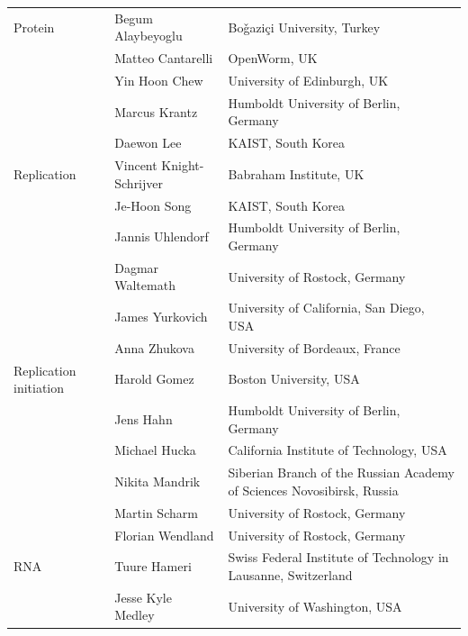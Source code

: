 \documentclass[journal,transmag]{IEEEtran}
\begin{document}
\begin{table}[ht!]
\begin{tabularx}{\textwidth}{l||l||X}
Protein                & Begum Alaybeyoglu                & Bo\v{g}azi\c{c}i University, Turkey\\
                       & Matteo Cantarelli                & OpenWorm, UK\\
                       & Yin Hoon Chew                    & University of Edinburgh, UK\\
                       & Marcus Krantz                    & Humboldt University of Berlin, Germany\\
                       & Daewon Lee                       & KAIST, South Korea\\\hline
Replication            & Vincent Knight-Schrijver         & Babraham Institute, UK\\
                       & Je-Hoon Song                     & KAIST, South Korea\\
                       & Jannis Uhlendorf                 & Humboldt University of Berlin, Germany\\
                       & Dagmar Waltemath                 & University of Rostock, Germany\\
                       & James Yurkovich                  & University of California, San Diego, USA\\
                       & Anna Zhukova                     & University of Bordeaux, France\\\hline
Replication initiation & Harold Gomez                     & Boston University, USA\\
                       & Jens Hahn                        & Humboldt University of Berlin, Germany\\
                       & Michael Hucka                    & California Institute of Technology, USA\\
                       & Nikita Mandrik                   & Siberian Branch of the Russian Academy of Sciences Novosibirsk, Russia\\
                       & Martin Scharm                    & University of Rostock, Germany\\
                       & Florian Wendland                 & University of Rostock, Germany\\\hline
RNA                    & Tuure Hameri                     & Swiss Federal Institute of Technology in Lausanne, Switzerland\\
                       & Jesse Kyle Medley                & University of Washington, USA\\

\end{tabularx}
\end{table}
\end{document}
